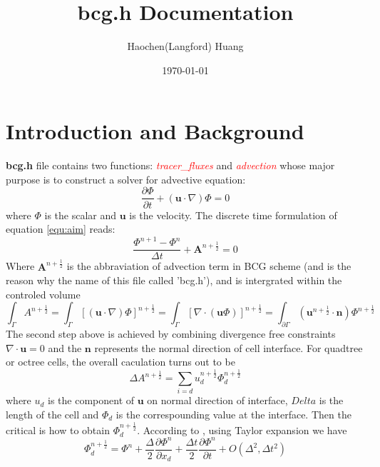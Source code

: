 \documentclass[a4paper]{article}
\title{bcg.h Documentation}
\author{Haochen(Langford) Huang}
\date{\today}
\begin{document}
\maketitle

\section{Introduction and Background}\label{sec:intro}
\textbf{bcg.h} file contains two functions: \textcolor{red}{\emph{tracer\_fluxes}} and \textcolor{red}{\emph{advection}} whose major purpose is to construct a solver for advective equation:
\begin{equation}
  \frac{\partial \Phi}{\partial t} + ( \mathbf{u} \cdot \nabla)\Phi = 0\label{equ:aim}
\end{equation}
where $\Phi$ is the scalar and $ \mathbf{u}$ is the velocity. The discrete time formulation of equation \ref{equ:aim} reads:
\begin{equation}
  \frac{\Phi^{n+1}-\Phi^{n}}{\Delta t} + \mathbf{A}^{n+\frac{1}{2}} = 0 \label{equ:general}
\end{equation}
Where $ \mathbf{A}^{n+ \frac{1}{2}}$ is the abbraviation of advection term in BCG\cite{bell1989second,popinet2003gerris} scheme (and is the reason why the name of this file called 'bcg.h'), and is intergrated within the controled volume
\begin{equation}
  \int_{\Gamma} A^{n+ \frac{1}{2}} = \int_{\Gamma} [( \mathbf{u}\cdot \nabla)\Phi]^{n+ \frac{1}{2}} = \int_{\Gamma} [\nabla\cdot( \mathbf{u} \Phi)]^{n+ \frac{1}{2}} = \int_{\partial \Gamma} ( \mathbf{u}^{n + \frac{1}{2}} \cdot \mathbf{n}) \Phi^{n+ \frac{1}{2}}
\end{equation}
The second step above is achieved by combining divergence free constraints $\nabla\cdot \mathbf{u}=0$ and the $ \mathbf{n}$ represents the normal direction of cell interface. For quadtree or octree cells, the overall caculation turns out to be
\begin{equation}
  \Delta A^{n+ \frac{1}{2}} = \sum_{i=d} u_d^{n+ \frac{1}{2}}\Phi_d^{n + \frac{1}{2}} 
\end{equation}
where $u_d$ is the component of $ \mathbf{u}$ on normal direction of interface, $Delta$ is the length of the cell and $\Phi_d$ is the correspounding value at the interface. Then the critical is how to obtain $\Phi_d^{n + \frac{1}{2}}$. According to \cite{popinet2003gerris}, using Taylor expansion we have
\begin{equation}
  \Phi^{n+ \frac{1}{2}}_d = \Phi^n+ \frac{\Delta}{2} \frac{\partial \Phi^n}{\partial x_d} + \frac{\Delta t}{2} \frac{\partial \Phi^n}{\partial t} + O(\Delta^2,\Delta t^2)
\end{equation}
\end{document}
